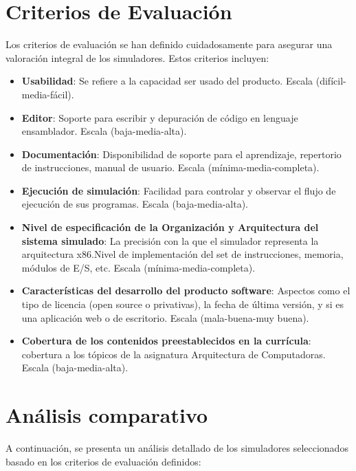\documentclass[12pt,twoside]{templates/unerthesis}
\begin{document}
\hypertarget{criterios-de-evaluaciuxf3n}{%
\section{Criterios de Evaluación}\label{criterios-de-evaluaciuxf3n}}

Los criterios de evaluación se han definido cuidadosamente para asegurar una valoración integral de los simuladores. Estos criterios incluyen:

\begin{itemize}
\item
  \textbf{Usabilidad}: Se refiere a la capacidad ser usado del producto. Escala (difícil-media-fácil).
\item
  \textbf{Editor}: Soporte para escribir y depuración de código en lenguaje ensamblador. Escala (baja-media-alta).
\item
  \textbf{Documentación}: Disponibilidad de soporte para el aprendizaje, repertorio de instrucciones, manual de usuario. Escala (mínima-media-completa).
\item
  \textbf{Ejecución de simulación}: Facilidad para controlar y observar el flujo de ejecución de sus programas. Escala (baja-media-alta).
\item
  \textbf{Nivel de especificación de la Organización y Arquitectura del sistema simulado}: La precisión con la que el simulador representa la arquitectura x86.Nivel de implementación del set de instrucciones, memoria, módulos de E/S, etc. Escala (mínima-media-completa).
\item
  \textbf{Características del desarrollo del producto software}: Aspectos como el tipo de licencia (open source o privativas), la fecha de última versión, y si es una aplicación web o de escritorio. Escala (mala-buena-muy buena).
\item
  \textbf{Cobertura de los contenidos preestablecidos en la currícula}: cobertura a los tópicos de la asignatura Arquitectura de Computadoras. Escala (baja-media-alta).
\end{itemize}

\hypertarget{anuxe1lisis-comparativo}{%
\section{Análisis comparativo}\label{anuxe1lisis-comparativo}}

A continuación, se presenta un análisis detallado de los simuladores seleccionados basado en los criterios de evaluación definidos:
\end{document}
